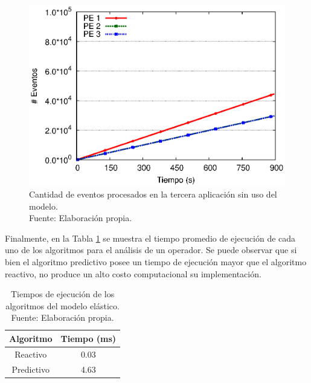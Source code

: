 \begin{figure}[!ht]
	\centering
	\captionsetup{justification=centering}
    \includegraphics[scale=0.75]{images/exp/app3/sm/logical/eventCount.eps}
    \caption[Cantidad de eventos procesados en la tercera aplicación sin uso del modelo.]{Cantidad de eventos procesados en la tercera aplicación sin uso del modelo.\\Fuente: Elaboración propia.}
    \label{fig:app3-eventCount-sm}
\end{figure}

Finalmente, en la Tabla \ref{tab:tiempo-algoritmos} se muestra el tiempo promedio de ejecución de cada uno de los algoritmos para el análisis de un operador. Se puede observar que si bien el algoritmo predictivo posee un tiempo de ejecución mayor que el algoritmo reactivo, no produce un alto costo computacional su implementación.

\newpage
\begin{table}[!ht]
\centering
\captionsetup{justification=centering}
\caption[Tiempos de ejecución de los algoritmos del modelo elástico.]{Tiempos de ejecución de los algoritmos del modelo elástico.\\Fuente: Elaboración propia.}
\begin{tabular}{| c | c |}
\hline
Algoritmo & Tiempo (ms) \\ \hline
Reactivo & 0.03 \\
Predictivo & 4.63 \\ \hline
\end{tabular}
\label{tab:tiempo-algoritmos}
\end{table}


